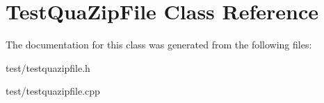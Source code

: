 \section{TestQuaZipFile Class Reference}
\label{classTestQuaZipFile}


The documentation for this class was generated from the following files:\begin{DoxyCompactItemize}
\item 
test/testquazipfile.h\item 
test/testquazipfile.cpp\end{DoxyCompactItemize}
